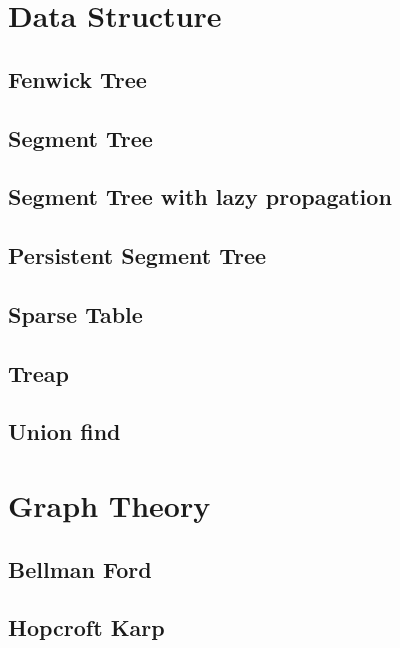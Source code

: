 \section{Data Structure}
\subsection{Fenwick Tree}
\raggedbottom
\subsection{Segment Tree}
\raggedbottom
\subsection{Segment Tree with lazy propagation}
\raggedbottom
\subsection{Persistent Segment Tree}
\raggedbottom
\subsection{Sparse Table}
\raggedbottom
\subsection{Treap}
\raggedbottom
\subsection{Union find}
\raggedbottom

\hrulefill

\section{Graph Theory}
\subsection{Bellman Ford}
\raggedbottom
\subsection{Hopcroft Karp}
\raggedbottom
